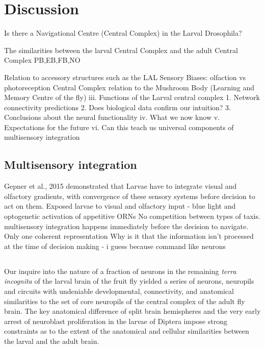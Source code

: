 \chapter{Discussion}
	Is there a Navigational Centre (Central Complex) in the Larval Drosophila?

	The similarities between the larval Central Complex and the adult Central Complex
        PB,EB,FB,NO

        Relation to accessory structures such as the LAL 
        Sensory Biases: olfaction vs photoreception
        Central Complex relation to the Mushroom Body (Learning and Memory Centre of the fly)
iii.	Functions of the Larval central complex 
1.	Network connectivity predictions
2.	Does biological data confirm our intuition?
3.	Conclusions about the neural functionality
iv.	What we now know
v.	Expectations for the future
vi.	Can this teach us universal components of multisensory integration 


\section{Multisensory integration}
 Gepner et al., 2015 demonstrated that Larvae  have to integrate visual and olfactory gradients, with convergence of these sensory systems before decision to act on them. 
 Exposed larvae to visual and olfactory input - blue light and optogenetic activation of appetitive ORNs
No competition between types of taxis. 
multisensory integration happens immediately before the decision to navigate. Only one coherent representation
Why is it that the information isn’t processed at the time of decision making  - i guess because command like neurons 


\section{}


Our inquire into the nature of a fraction of neurons in the remaining \textit{terra incognita} of the larval brain of the fruit fly yielded a series of neurons, neuropils and circuits with undeniable developmental, connectivity, and anatomical similarities to the set of core neuropils of the central complex of the adult fly brain.
The key anatomical difference of split brain hemispheres and the very early arrest of neuroblast proliferation in the larvae of Diptera impose strong constraints as to the extent of the anatomical and cellular similarities between the larval and the adult brain.

